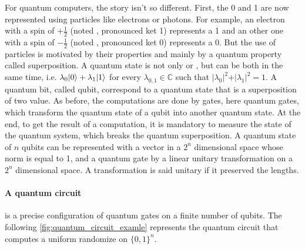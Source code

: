 For quantum computers, the story isn't so different. First, the 0 and 1 are
now represented using particles like electrons or photons. For example,
an electron with a spin of $+\frac{1}{2}$ (noted , pronounced ket 1) represents a 1 and
an other one with a spin of $-\frac{1}{2}$ (noted , pronounced ket 0) represents a 0.
But the use of particles is motivated by their properties and mainly by
a quantum property called superposition. A quantum state is not only 
or , but can be both in the same time, i.e.
$\lambda_0 |0\rangle + \lambda_1 |1\rangle$ for every $\lambda_{0, 1} \in \mathbb{C}$
such that $\vert\lambda_0\vert^2+\vert\lambda_1\vert ^2=1$. A quantum bit,
called qubit, correspond to a quantum state that is a superposition of two
value. As before, the computations are done by gates, here
quantum gates, which transform the quantum state of a qubit into another
quantum state.
At the end, to get the result of a computation, it is mandatory to measure the
state of the quantum system, which breaks the quantum superposition. A quantum
state of $n$ qubits can be represented with a vector in a $2^n$
dimensional space whose norm is equal to 1, and a quantum gate by a linear
unitary transformation on a $2^n$ dimensional space. A transformation is said
unitary if it preserved the lengths.

\paragraph*{A quantum circuit} is a precise configuration of quantum gates
on a finite number of qubits. The following \autoref{fig:quantum_circuit_examle}
represents the quantum circuit that computes a uniform randomize on $\{0, 1\}^n$.

